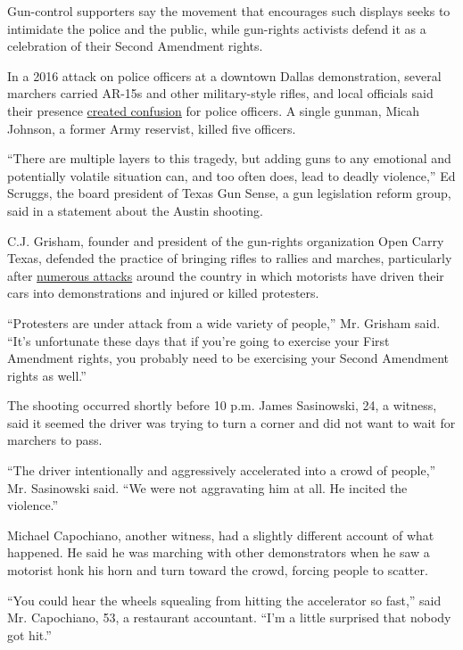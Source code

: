 Gun-control supporters say the movement that encourages such displays
seeks to intimidate the police and the public, while gun-rights
activists defend it as a celebration of their Second Amendment rights.

In a 2016 attack on police officers at a downtown Dallas demonstration,
several marchers carried AR-15s and other military-style rifles, and
local officials said their presence
\href{https://www.nytimes.com/2016/07/11/us/texas-open-carry-laws-blurred-lines-between-suspects-and-marchers.html}{created
confusion} for police officers. A single gunman, Micah Johnson, a former
Army reservist, killed five officers.

``There are multiple layers to this tragedy, but adding guns to any
emotional and potentially volatile situation can, and too often does,
lead to deadly violence,'' Ed Scruggs, the board president of Texas Gun
Sense, a gun legislation reform group, said in a statement about the
Austin shooting.

C.J. Grisham, founder and president of the gun-rights organization Open
Carry Texas, defended the practice of bringing rifles to rallies and
marches, particularly after
\href{https://www.nytimes.com/2020/07/09/us/bloomington-vauhxx-booker-car-protesters.html}{numerous
attacks} around the country in which motorists have driven their cars
into demonstrations and injured or killed protesters.

``Protesters are under attack from a wide variety of people,'' Mr.
Grisham said. ``It's unfortunate these days that if you're going to
exercise your First Amendment rights, you probably need to be exercising
your Second Amendment rights as well.''

The shooting occurred shortly before 10 p.m. James Sasinowski, 24, a
witness, said it seemed the driver was trying to turn a corner and did
not want to wait for marchers to pass.

``The driver intentionally and aggressively accelerated into a crowd of
people,'' Mr. Sasinowski said. ``We were not aggravating him at all. He
incited the violence.''

Michael Capochiano, another witness, had a slightly different account of
what happened. He said he was marching with other demonstrators when he
saw a motorist honk his horn and turn toward the crowd, forcing people
to scatter.

``You could hear the wheels squealing from hitting the accelerator so
fast,'' said Mr. Capochiano, 53, a restaurant accountant. ``I'm a little
surprised that nobody got hit.''

